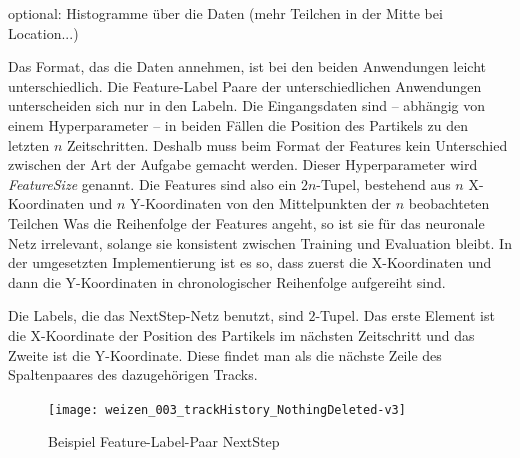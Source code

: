 optional: Histogramme über die Daten (mehr Teilchen in der Mitte bei Location...)
\color{black}

Das Format, das die Daten annehmen, ist bei den beiden Anwendungen leicht unterschiedlich.
Die Feature-Label Paare der unterschiedlichen Anwendungen unterscheiden sich nur in den Labeln.
Die Eingangsdaten sind -- abhängig von einem Hyperparameter --
in beiden Fällen die Position des Partikels zu den letzten \(n\) Zeitschritten.
Deshalb muss beim Format der Features kein Unterschied zwischen der Art der Aufgabe gemacht werden.
Dieser Hyperparameter wird \textit{FeatureSize} genannt. 
Die Features sind also ein \(2n\)-Tupel, bestehend aus \(n\) X-Koordinaten und \(n\) Y-Koordinaten 
von den Mittelpunkten der \(n\) beobachteten Teilchen
Was die Reihenfolge der Features angeht, so ist sie für das neuronale Netz irrelevant, 
solange sie konsistent zwischen Training und Evaluation bleibt. 
In der umgesetzten Implementierung ist es so, dass zuerst die X-Koordinaten 
und dann die Y-Koordinaten in chronologischer Reihenfolge aufgereiht sind. 



Die Labels, die das NextStep-Netz benutzt, sind \(2\)-Tupel.
Das erste Element ist die X-Koordinate der Position des Partikels im nächsten Zeitschritt 
und das Zweite ist die Y-Koordinate.
Diese findet man als die nächste Zeile des Spaltenpaares des dazugehörigen Tracks.

\begin{figure}
	\centering
	\texttt{[image: weizen\_003\_trackHistory\_NothingDeleted-v3]}
	\caption{Beispiel Feature-Label-Paar NextStep}
	\label{fig:FLPNext}
\end{figure}


